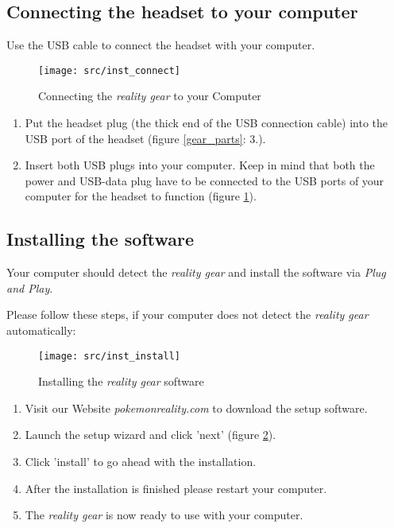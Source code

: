 \subsection{Connecting the headset to your computer}
Use the USB cable to connect the headset with your computer.
\begin{figure}[!ht]
\begin{center}
\texttt{[image: src/inst\_connect]}
\end{center}
\caption[Connecting the \emph{\pokeT{} reality gear} to your Computer]{Connecting the \emph{\poke{} reality gear} to your Computer}
\label{gear_connect}
\end{figure}
\begin{enumerate}
\item Put the headset plug (the thick end of the USB connection cable) into the USB port of the headset (figure \ref{gear_parts}: 3.).
\item Insert both USB plugs into your computer. Keep in mind that both the power and USB-data plug have to be connected to the USB ports of your computer for the headset to function (figure \ref{gear_connect}).
\end{enumerate}

\subsection{Installing the software}
\label{installSoftware}
Your computer should detect the \emph{\poke{} reality gear} and install the software via \emph{Plug and Play}. 

Please follow these steps, if your computer does not detect the \emph{\poke{} reality gear} automatically:
\begin{figure}[!ht]
\begin{center}
\texttt{[image: src/inst\_install]}
\end{center}
\caption[Installing the \emph{\pokeT{} reality gear} software]{Installing the \emph{\poke{} reality gear} software}
\label{gear_install}
\end{figure}
\begin{enumerate}
\item Visit our Website \emph{pokemonreality.com} to download the \poke{} setup software. 
\item Launch the \poke{} setup wizard and click 'next' (figure \ref{gear_install}).
\item Click 'install' to go ahead with the installation.
\item After the installation is finished please restart your computer. 
\item The \emph{\poke{} reality gear} is now ready to use with your computer.
\end{enumerate}

